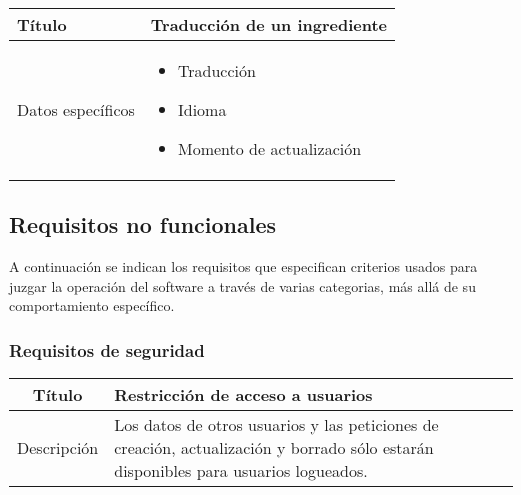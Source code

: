 \begin{center}  
  \begin{tabularx}{\textwidth}{|l|X|}
    \hline

    Título & Traducción de un ingrediente\\

    \hline
    Datos específicos &

    \begin{itemize}
    \item Traducción
    \item Idioma
    \item Momento de actualización
    \end{itemize}
    \\
    
    \hline
    
  \end{tabularx}
\end{center}

\subsection{Requisitos no funcionales}

A continuación se indican los requisitos que especifican criterios usados para
juzgar la operación del software a través de varias categorias, más allá de su
comportamiento específico.

\subsubsection{Requisitos de seguridad}

\begin{center}
  
  \begin{tabularx}{\textwidth}{|c|X|}
    \hline
    Título & Restricción de acceso a usuarios \\

    \hline

    Descripción & Los datos de otros usuarios y las peticiones de creación,
    actualización y borrado sólo estarán disponibles para usuarios logueados.\\


    \hline
  \end{tabularx}
\end{center}

